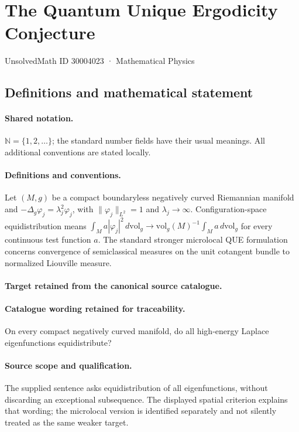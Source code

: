 \documentclass[11pt]{article}
\begin{document}
\setcounter{section}{30004022}
\section{The Quantum Unique Ergodicity Conjecture}\label{30004023}
{\small UnsolvedMath ID 30004023 · Mathematical Physics}
\subsection{Definitions and mathematical statement}

\paragraph{Shared notation.}$\mathbb N=\{1,2,\ldots\}$; the standard number fields have their usual meanings. All additional conventions are stated locally.


\paragraph{Definitions and conventions.}
Let $(M,g)$ be a compact boundaryless negatively curved Riemannian manifold and $-\Delta_g\varphi_j=\lambda_j^2\varphi_j$, with $\|\varphi_j\|_{L^2}=1$ and $\lambda_j\to\infty$. Configuration-space equidistribution means $\int_M a|\varphi_j|^2\,d\mathrm{vol}_g\to \mathrm{vol}_g(M)^{-1}\int_M a\,d\mathrm{vol}_g$ for every continuous test function $a$. The standard stronger microlocal QUE formulation concerns convergence of semiclassical measures on the unit cotangent bundle to normalized Liouville measure.

\paragraph{Target retained from the canonical source catalogue.}
\paragraph{Catalogue wording retained for traceability.}
On every compact negatively curved manifold, do all high-energy Laplace eigenfunctions equidistribute?

\paragraph{Source scope and qualification.}
The supplied sentence asks equidistribution of all eigenfunctions, without discarding an exceptional subsequence. The displayed spatial criterion explains that wording; the microlocal version is identified separately and not silently treated as the same weaker target.
\end{document}
